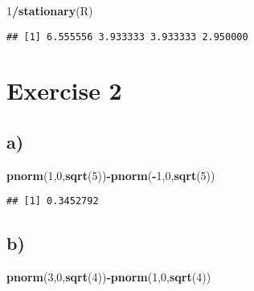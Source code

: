 \documentclass[
]{article}
\newenvironment{Shaded}{\begin{snugshade}}{\end{snugshade}}
\newcommand{\DecValTok}[1]{\textcolor[rgb]{0.00,0.00,0.81}{#1}}
\newcommand{\FunctionTok}[1]{\textcolor[rgb]{0.13,0.29,0.53}{\textbf{#1}}}
\newcommand{\NormalTok}[1]{#1}
\newcommand{\SpecialCharTok}[1]{\textcolor[rgb]{0.81,0.36,0.00}{\textbf{#1}}}
\begin{document}
\begin{Shaded}
\begin{Highlighting}[]
\DecValTok{1}\SpecialCharTok{/}\FunctionTok{stationary}\NormalTok{(R)}
\end{Highlighting}
\end{Shaded}

\begin{verbatim}
## [1] 6.555556 3.933333 3.933333 2.950000
\end{verbatim}

\hypertarget{exercise-2}{%
\section{Exercise 2}\label{exercise-2}}

\hypertarget{a}{%
\subsection{a)}\label{a}}

\begin{Shaded}
\begin{Highlighting}[]
\FunctionTok{pnorm}\NormalTok{(}\DecValTok{1}\NormalTok{,}\DecValTok{0}\NormalTok{,}\FunctionTok{sqrt}\NormalTok{(}\DecValTok{5}\NormalTok{))}\SpecialCharTok{{-}}\FunctionTok{pnorm}\NormalTok{(}\SpecialCharTok{{-}}\DecValTok{1}\NormalTok{,}\DecValTok{0}\NormalTok{,}\FunctionTok{sqrt}\NormalTok{(}\DecValTok{5}\NormalTok{))}
\end{Highlighting}
\end{Shaded}

\begin{verbatim}
## [1] 0.3452792
\end{verbatim}

\hypertarget{b-1}{%
\subsection{b)}\label{b-1}}

\begin{Shaded}
\begin{Highlighting}[]
\FunctionTok{pnorm}\NormalTok{(}\DecValTok{3}\NormalTok{,}\DecValTok{0}\NormalTok{,}\FunctionTok{sqrt}\NormalTok{(}\DecValTok{4}\NormalTok{))}\SpecialCharTok{{-}}\FunctionTok{pnorm}\NormalTok{(}\DecValTok{1}\NormalTok{,}\DecValTok{0}\NormalTok{,}\FunctionTok{sqrt}\NormalTok{(}\DecValTok{4}\NormalTok{))}
\end{Highlighting}
\end{Shaded}
\end{document}
